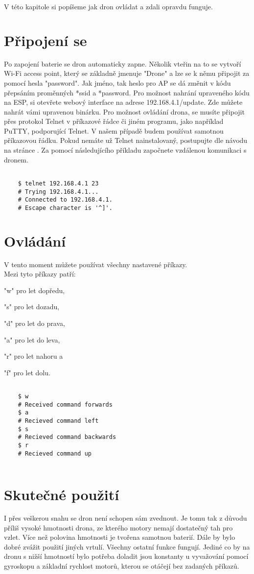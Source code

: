 V této kapitole si popíšeme jak dron ovládat a zdali opravdu funguje.

\section{Připojení se}
    Po zapojení baterie se dron automaticky zapne. Několik vteřin na to se vytvoří Wi-Fi access point, který se základně jmenuje "Drone" a lze se k němu připojit za pomocí hesla "password". Jak jméno, tak heslo pro AP se dá změnit v kódu přepsáním proměnných *ssid a *password. Pro možnost nahrání upraveného kódu na ESP, si otevřete webový interface na adrese 192.168.4.1/update. Zde můžete nahrát vámi upravenou binárku. Pro možnost ovládání drona, se musíte připojit přes protokol Telnet v příkazové řádce či jiném programu, jako například PuTTY, podporující Telnet. V našem případě budem používat samotnou příkazovou řádku. Pokud nemáte už Telnet nainstalovaný, postupujte dle návodu na stránce \parencite[Telnet download tutorial]{telnet}. Za pomocí následujícího příkladu započnete vzdálenou komunikaci s dronem.
    
    \begin{lstlisting}

    $ telnet 192.168.4.1 23
    # Trying 192.168.4.1...
    # Connected to 192.168.4.1.
    # Escape character is '^]'.

    \end{lstlisting}
    
\section{Ovládání}
    V tento moment můžete používat všechny nastavené příkazy.\\ Mezi tyto příkazy patří:\par "w" pro let dopředu,\par "s" pro let dozadu,\par "d" pro let do prava,\par "a" pro let do leva,\par "r" pro let nahoru a\par "f" pro let dolu.

    \begin{lstlisting}

    $ w
    # Received command forwards
    $ a
    # Recieved command left
    $ s
    # Recieved command backwards
    $ r
    # Recieved command up
       
    \end{lstlisting}

\newpage

\section{Skutečné použití}
     I přes veškerou snahu se dron není schopen sám zvednout. Je tomu tak z důvodu příliš vysoké hmotnosti drona, ze kterého motory nemají dostatečný tah pro vzlet. Více než polovina hmotnosti je tvořena samotnou baterií. Dále by bylo dobré zvážit použití jiných vrtulí. Všechny ostatní funkce fungují. Jediné co by na dronu s nižší hmotností bylo potřeba doladit jsou konstanty u vyvažování pomocí gyroskopu a základní rychlost motorů, kterou se otáčejí bez zadaných příkazů.